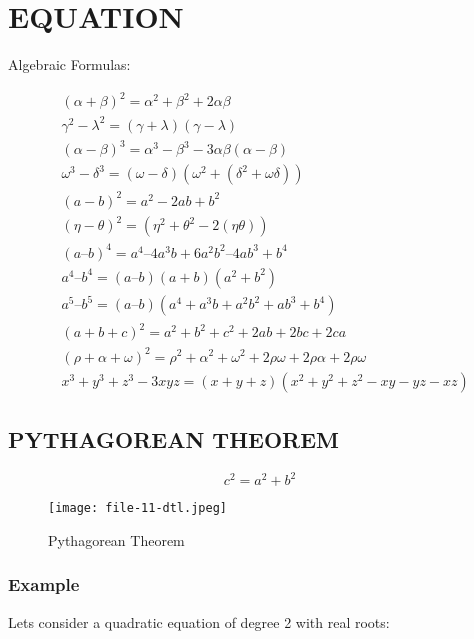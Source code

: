 \documentclass{article}
\begin{document}
\section{EQUATION}
Algebraic Formulas:

\begin{align}
	&({\alpha}+{\beta})^2 = {\alpha}^2 + {\beta}^2 + 2{\alpha}{\beta}\\
	&{\gamma}^2 - {\lambda}^2 = ({\gamma}+{\lambda})({\gamma}-{\lambda}) \\
	&({\alpha}-{\beta})^3 = {\alpha}^3 - {\beta}^3 - 3{\alpha}{\beta}({\alpha}-{\beta})\\
	&{\omega}^3 - {\delta}^3 = ({\omega}-{\delta})({\omega}^2+ ({\delta}^2+{\omega}{\delta})) \\
	&(a-b)^2 = a^2 - 2ab + b^2 \\
	&({\eta}-{\theta})^2 = ({\eta}^2 + {\theta}^2 - 2({\eta}{\theta})) \\
	&(a – b)^4 = a^4 – 4a^3b + 6a^2b^2 – 4ab^3 + b^4\\
	&a^4 – b^4 = (a – b)(a + b)(a^2 + b^2)\\
	&a^5 – b^5 = (a – b)(a^4 + a^3b + a^2b^2 + ab^3 + b^4)\\
	&(a +b+ c)^2=a^2+b^2+c^2+2ab+2bc+2ca\\
	&({\rho}+ {\alpha}+ {\omega})^2={\rho}^2+{\alpha}^2+{\omega}^2+2{\rho}{\omega}+2{\rho}{\alpha}+2{\rho}{\omega}\\
	&x^3 + y^3 + z^3 - 3xyz = (x + y + z)(x^2 + y^2 + z^2 - xy - yz - xz)
\end{align}


\subsection{PYTHAGOREAN THEOREM}
\[
c^2 = a^2 + b^2
\]
\begin{figure}
\texttt{[image: file-11-dtl.jpeg]}
\caption{Pythagorean Theorem}
\label{fig:Pythagorean Diagram}
\end{figure}

\subsubsection{Example}
Lets consider a quadratic equation of degree 2 with real roots:
\end{document}
